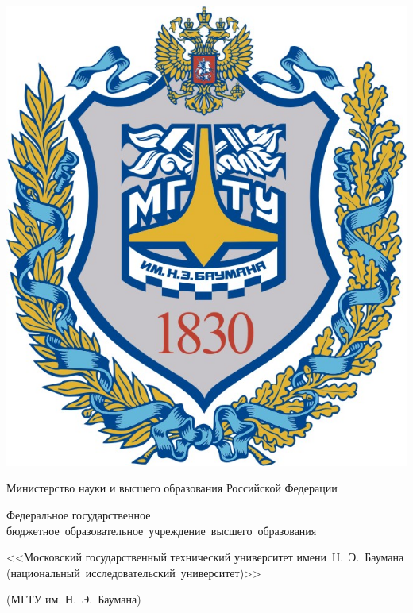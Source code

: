 \begin{titlepage}
    \fontsize{12pt}{12pt}\selectfont

    \noindent
    \begin{center}
        \begin{minipage}{0.15\textwidth}
            \includegraphics[width=\linewidth]{img/bmstu_logo.jpg}
        \end{minipage}
        \begin{minipage}{0.80\textwidth}\centering\bfseries
            {
                \linespread{1}\selectfont
                \vspace{0.1cm}
                {Министерство науки и высшего образования Российской Федерации}

                {Федеральное государственное бюджетное~образовательное~учреждение~высшего~образования}

                {<<Московский государственный технический университет имени~Н.~Э.~Баумана (национальный~исследовательский~университет)>>}

                {(МГТУ им. Н.~Э.~Баумана)}
                \vspace{0.1cm}
            }
        \end{minipage}


\end{center}
\end{titlepage}
